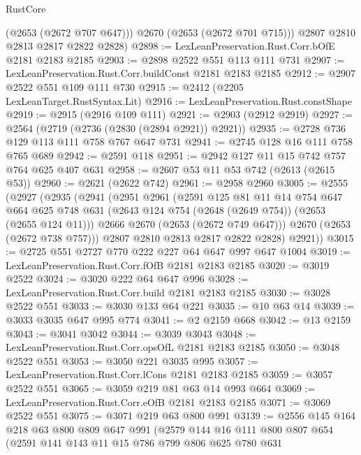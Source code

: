 \begin{lexlean}{RustCore}
\begin{coremodule}
          (@2653 (@2672 @707 @647)))
        @2670
        (@2653 (@2672 @701 @715)))
      @2807
      @2810
      @2813
      @2817
      @2822
      @2828)
@2898 := LexLeanPreservation.Rust.Corr.bOfE @2181 @2183 @2185
@2903 := @2898 @2522 @551 @113 @111 @731
@2907 := LexLeanPreservation.Rust.Corr.buildConst @2181 @2183 @2185
@2912 := @2907 @2522 @551 @109 @111 @730
@2915 := @2412 (@2205 LexLeanTarget.RustSyntax.Lit)
@2916 := LexLeanPreservation.Rust.constShape
@2919 := @2915 (@2916 @109 @111)
@2921 := @2903 (@2912 @2919)
@2927 := @2564 (@2719 (@2736 (@2830 (@2894 @2921)) @2921))
@2935 := @2728 @736 @129 @113 @111 @758 @767 @647 @731
@2941 := @2745 @128 @16 @111 @758 @765 @689
@2942 := @2591 @118
@2951 := @2942 @127 @11 @15 @742 @757 @764 @625 @407 @631
@2958 := @2607 @53 @11 @53 @742 (@2613 (@2615 @53))
@2960 := @2621 (@2622 @742)
@2961 := @2958 @2960
@3005 := @2555
    (@2927
      (@2935
        (@2941
          (@2951
            @2961
            (@2591
              @125
              @81
              @11
              @14
              @754
              @647
              @664
              @625
              @748
              @631
              (@2643 @124 @754 (@2648 (@2649 @754)) (@2653 (@2655 @124 @11)))
              @2666
              @2670
              (@2653 (@2672 @749 @647)))
            @2670
            (@2653 (@2672 @738 @757)))
          @2807
          @2810
          @2813
          @2817
          @2822
          @2828)
        @2921))
@3015 := @2725 @551 @2727 @770 @222 @227 @64 @647 @997 @647 @1004
@3019 := LexLeanPreservation.Rust.Corr.fOfB @2181 @2183 @2185
@3020 := @3019 @2522
@3024 := @3020 @222 @64 @647 @996
@3028 := LexLeanPreservation.Rust.Corr.build @2181 @2183 @2185
@3030 := @3028 @2522 @551
@3033 := @3030 @133 @64 @221
@3035 := @10 @63 @14
@3039 := @3033 @3035 @647 @995 @774
@3041 := @2 @2159 @668
@3042 := @13 @2159
@3043 := @3041 @3042
@3044 := @3039 @3043
@3048 := LexLeanPreservation.Rust.Corr.opsOfL @2181 @2183 @2185
@3050 := @3048 @2522 @551
@3053 := @3050 @221 @3035 @995
@3057 := LexLeanPreservation.Rust.Corr.lCons @2181 @2183 @2185
@3059 := @3057 @2522 @551
@3065 := @3059 @219 @81 @63 @14 @993 @664
@3069 := LexLeanPreservation.Rust.Corr.eOfB @2181 @2183 @2185
@3071 := @3069 @2522 @551
@3075 := @3071 @219 @63 @800 @991
@3139 := @2556
    @145
    @164
    @218
    @63
    @800
    @809
    @647
    @991
    (@2579
      @144
      @16
      @111
      @800
      @807
      @654
      (@2591
        @141
        @143
        @11
        @15
        @786
        @799
        @806
        @625
        @780
        @631

\end{coremodule}
\end{lexlean}

